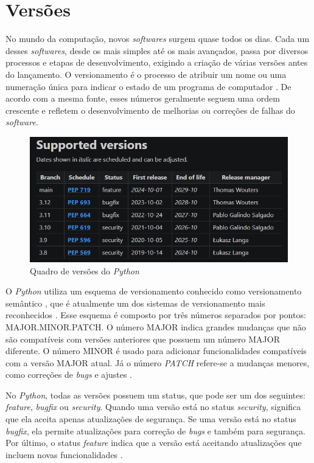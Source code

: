 
\section{Versões}

No mundo da computação, novos \textit{softwares} surgem quase todos os dias. Cada um desses \textit{softwares}, desde os mais simples até os mais avançados, passa por diversos processos e etapas de desenvolvimento, exigindo a criação de várias versões antes do lançamento. O versionamento é o processo de atribuir um nome ou uma numeração única para indicar o estado de um programa de computador \cite{wikipedia_versionamento}. De acordo com a mesma fonte, esses números geralmente seguem uma ordem crescente e refletem o desenvolvimento de melhorias ou correções de falhas do \textit{software}.

\begin{figure}
    \centering
    \includegraphics[width=0.5\linewidth]{img/versoes-python.png}
    \caption{Quadro de versões do \textit{Python} \cite{hashtagtreinamentos_python_versions}}
    \label{fig:enter-label}
\end{figure}

O \textit{Python} utiliza um esquema de versionamento conhecido como versionamento semântico \cite{hashtagtreinamentos_python_versions}, que é atualmente um dos sistemas de versionamento mais reconhecidos \cite{wikipedia_versionamento}. Esse esquema é composto por três números separados por pontos: MAJOR.MINOR.PATCH. O número MAJOR indica grandes mudanças que não são compatíveis com versões anteriores que possuem um número MAJOR diferente. O número MINOR é usado para adicionar funcionalidades compatíveis com a versão MAJOR atual. Já o número \textit{PATCH} refere-se a mudanças menores, como correções de \textit{bugs} e ajustes \cite{wikipedia_versionamento}.

No \textit{Python}, todas as versões possuem um status, que pode ser um dos seguintes: \textit{feature}, \textit{bugfix} ou \textit{security}. Quando uma versão está no status \textit{security}, significa que ela aceita apenas atualizações de segurança. Se uma versão está no status \textit{bugfix}, ela permite atualizações para correção de \textit{bugs} e também para segurança. Por último, o status \textit{feature} indica que a versão está aceitando atualizações que incluem novas funcionalidades \cite{hashtagtreinamentos_python_versions}.



